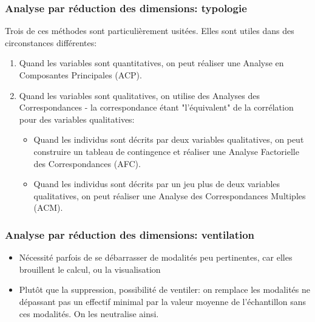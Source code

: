 \documentclass{beamer}
\begin{document}
\begin{frame}[fragile]
\frametitle{Analyse par réduction des dimensions: typologie}

Trois de ces méthodes sont particulièrement usitées. Elles sont utiles dans des circonstances différentes: 
\begin{enumerate}
\item Quand les variables sont quantitatives, on peut réaliser une \alert{Analyse en Composantes Principales (ACP)}.
\item Quand les variables sont qualitatives, on utilise des \alert{Analyses des Correspondances} - la correspondance étant "l'équivalent" de la corrélation pour des variables qualitatives:
\begin{itemize}
\item Quand les individus sont décrits par deux variables qualitatives, on peut construire un tableau de contingence et réaliser une \alert{Analyse Factorielle des Correspondances (AFC)}. 
\item Quand les individus sont décrits par un jeu plus de deux variables qualitatives, on peut réaliser une \alert{Analyse des Correspondances Multiples (ACM)}.
\end{itemize}

\end{enumerate}
\end{frame}

\begin{frame}[fragile]

\frametitle{Analyse par réduction des dimensions: ventilation}

\begin{itemize}
\item Nécessité parfois de se débarrasser de modalités peu pertinentes, car elles brouillent le calcul, ou la visualisation
\item Plutôt que la suppression, possibilité de ventiler: on remplace les modalités ne dépassant pas un effectif minimal par la valeur moyenne de l'échantillon sans ces modalités. On les neutralise ainsi.
\end{itemize}
\end{frame}
\end{document}
